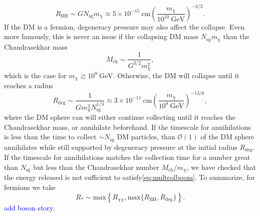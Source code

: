 \documentclass[preprintnumbers,amsmath,amssymb,prd,superscriptaddress]{revtex4}
\newcommand{\Eboom}{\mathcal{E}_\text{boom}}
\newcommand{\OO}{\mathcal{O}}
\newcommand{\GeV}{\text{GeV}}
\newcommand{\cm}{\text{cm}}
\def\r{\right)}
\def\l{\left(}
\begin{document}
\begin{equation}
R_\text{BH} \sim G N_\text{sg} m_\chi \approx 5 \times 10^{-15} ~\cm \l \frac{m_\chi}{10^{10} ~\GeV} \r^{-3/2}.
\end{equation}
If the DM is a fermion, degeneracy pressure may also affect the collapse. 
Even more famously, this is never an issue if the collapsing DM mass $N_\text{sg} m_\chi$ than the Chandrasekhar mass
\begin{equation}
M_\text{ch} \sim \frac{1}{G^{3/2} m_\chi^2},
\end{equation}
which is the case for $m_\chi \gtrsim 10^{9} ~\GeV$.
Otherwise, the DM will collapse until it reaches a radius
\begin{equation}
R_\text{deg} \sim \frac{1}{G m_\chi^3 N_\text{sg}^{1/3}} \approx 3 \times 10^{-11} ~\cm \l\frac{m_\chi}{10^{8} ~\GeV}\r^{-13/6},
\end{equation}
where the DM sphere can will either continue collecting until it reaches the Chandrasekhar mass, or annihilate beforehand. 
If the timescale for annihilations is less than the time to collect $\sim N_\text{sg}$ DM particles, than $\OO(1)$ of the DM sphere annihilates while still supported by degeneracy pressure at the initial radius $R_\text{deg}$. 
If the timescale for annihilations matches the collection time for a number great than $N_\text{sg}$ but less than the Chandrasekhar number $M_\text{ch}/m_\chi$, we have checked that the energy released is not sufficient to satisfy\eqref{eq:multcolboom}. 
To summarize, for fermions we take
\begin{equation}
R_* \sim \text{max}\left \{R_{\chi \chi}, \text{max}\{R_\text{BH}, R_\text{deg}\} \right \}. 
\end{equation}
\textcolor{blue}{add boson story}. 

\end{document}
